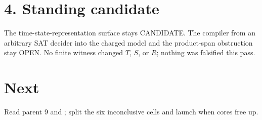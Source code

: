 \documentclass[11pt]{article}
\begin{document}
\section*{4. Standing candidate}
The time-state-representation surface stays CANDIDATE. The compiler from an arbitrary SAT decider into the charged model and the product-span obstruction stay OPEN. No finite witness changed $T$, $S$, or $R$; nothing was falsified this pass.

\section*{Next}
Read parent 9 and ; split the six inconclusive cells and launch  when cores free up.
\end{document}
